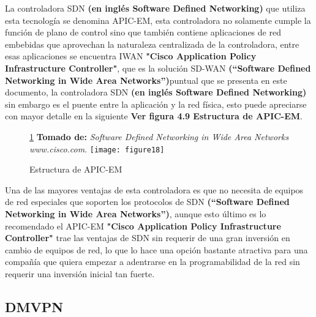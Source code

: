 La controladora SDN \textbf{(en inglés Software Defined Networking)} que utiliza esta tecnología se denomina APIC-EM, esta controladora no solamente cumple la función de plano de control sino que también contiene aplicaciones de red embebidas que aprovechan la naturaleza centralizada de la controladora, entre esas aplicaciones se encuentra IWAN \textbf{"Cisco Application Policy Infrastructure Controller"}, que es la solución SD-WAN \textbf{(“Software Defined Networking in Wide Area Networks”)}puntual que se presenta en este documento, la controladora SDN \textbf{(en inglés Software Defined Networking)} sin embargo es el puente entre la aplicación y la red física, esto puede apreciarse con mayor detalle en la siguiente \textbf{Ver figura 4.9 Estructura de APIC-EM}.
\begin{figure}[htbp]
\ref{fig:cisco} \textbf{Tomado de:} \textit{Software Defined Networking in Wide Area Networks www.cisco.com}.
  \centering
    {\texttt{[image: figure18]}}%
  \caption{\footnotesize{Estructura de APIC-EM}}
  \label{fig:cisco}
\end{figure}

Una de las mayores ventajas de esta controladora es que no necesita de equipos de red especiales que soporten los protocolos de SDN \textbf{(“Software Defined Networking in Wide Area Networks”)}, aunque esto último es lo recomendado el APIC-EM \textbf{"Cisco Application Policy Infrastructure Controller"} trae las ventajas de SDN sin requerir de una gran inversión en cambio de equipos de red, lo que lo hace una opción bastante atractiva para una compañía que quiera empezar a adentrarse en la programabilidad de la red sin requerir una inversión inicial tan fuerte.


\subsection{DMVPN}

